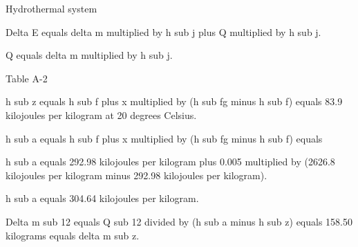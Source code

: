 Hydrothermal system  

Delta E equals delta m multiplied by h sub j plus Q multiplied by h sub j.  

Q equals delta m multiplied by h sub j.  

Table A-2  

h sub z equals h sub f plus x multiplied by (h sub fg minus h sub f) equals 83.9 kilojoules per kilogram at 20 degrees Celsius.  

h sub a equals h sub f plus x multiplied by (h sub fg minus h sub f) equals  

h sub a equals 292.98 kilojoules per kilogram plus 0.005 multiplied by (2626.8 kilojoules per kilogram minus 292.98 kilojoules per kilogram).  

h sub a equals 304.64 kilojoules per kilogram.  

Delta m sub 12 equals Q sub 12 divided by (h sub a minus h sub z) equals 158.50 kilograms equals delta m sub z.